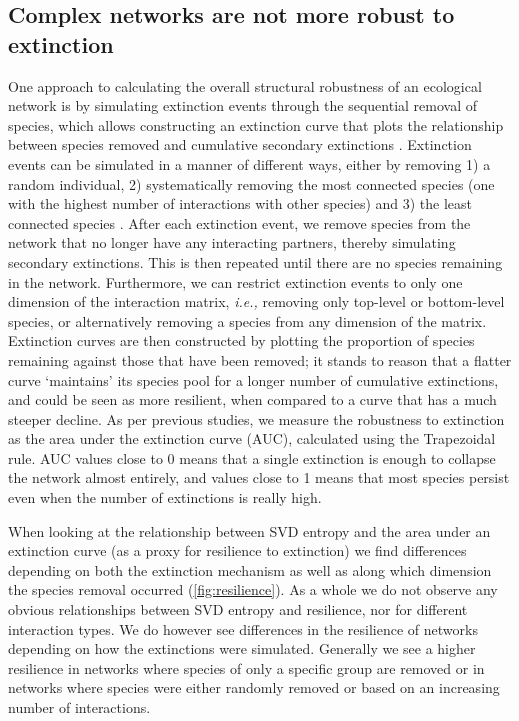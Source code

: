 \subsection{Complex networks are not more robust to
extinction}\label{complex-networks-are-not-more-robust-to-extinction}

One approach to calculating the overall structural robustness of an ecological
network is by simulating extinction events through the sequential removal of
species, which allows constructing an extinction curve that plots the
relationship between species removed and cumulative secondary extinctions
\cite{Dunne2002NetStr, Memmott2004TolPol}. Extinction events can be simulated in
a manner of different ways, either by removing 1) a random individual, 2)
systematically removing the most connected species (one with the highest number
of interactions with other species) and 3) the least connected species
\cite{Dunne2002NetStr}. After each extinction event, we remove species from the
network that no longer have any interacting partners, thereby simulating
secondary extinctions. This is then repeated until there are no species
remaining in the network. Furthermore, we can restrict extinction events to only
one dimension of the interaction matrix, \emph{i.e.,} removing only top-level or
bottom-level species, or alternatively removing a species from any dimension of
the matrix. Extinction curves are then constructed by plotting the proportion of
species remaining against those that have been removed; it stands to reason that
a flatter curve `maintains' its species pool for a longer number of cumulative
extinctions, and could be seen as more resilient, when compared to a curve that
has a much steeper decline. As per previous studies, we measure the robustness
to extinction as the area under the extinction curve (AUC), calculated using the
Trapezoidal rule. AUC values close to 0 means that a single extinction is enough
to collapse the network almost entirely, and values close to 1 means that most
species persist even when the number of extinctions is really high.

When looking at the relationship between SVD entropy and the area under an
extinction curve (as a proxy for resilience to extinction) we find differences
depending on both the extinction mechanism as well as along which dimension the
species removal occurred (\autoref{fig:resilience}). As a whole we do not
observe any obvious relationships between SVD entropy and resilience, nor for
different interaction types. We do however see differences in the resilience of
networks depending on how the extinctions were simulated. Generally we see a
higher resilience in networks where species of only a specific group are removed
or in networks where species were either randomly removed or based on an
increasing number of interactions.

